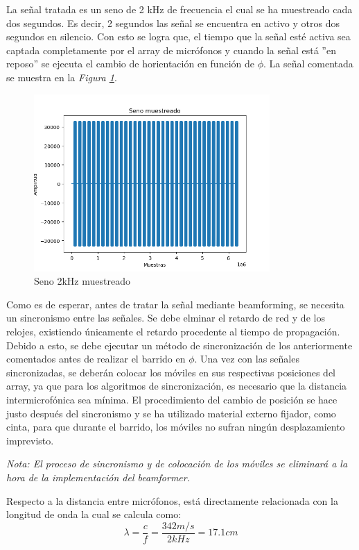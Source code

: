\documentclass[a4paper,11pt]{book}
\begin{document}
La señal tratada es un seno de 2 kHz de frecuencia el cual se ha muestreado cada dos segundos. Es decir, 2 segundos las señal se encuentra en activo y otros dos segundos en silencio. Con esto se logra que, el tiempo que la señal esté activa sea captada completamente por el array de micrófonos y cuando la señal está ''en reposo'' se ejecuta el cambio de horientación en función de $\phi$. La señal comentada se muestra en la \textit{Figura \ref{seno}}.

\begin{figure}[hbtp]
\centering
\includegraphics[width = 9cm]{FIGURAS/seno.png}
\caption{Seno 2kHz muestreado}
\label{seno}
\end{figure}

Como es de esperar, antes de tratar la señal mediante beamforming, se necesita un sincronismo entre las señales. Se debe elminar el retardo de red y de los relojes, existiendo únicamente el retardo procedente al tiempo de propagación. Debido a esto, se debe ejecutar un método de sincronización de los anteriormente comentados antes de realizar el barrido en $\phi$. Una vez con las señales sincronizadas, se deberán colocar los móviles en sus respectivas posiciones del array, ya que para los algoritmos de sincronización, es necesario que la distancia intermicrofónica sea mínima. El procedimiento del cambio de posición se hace justo después del sincronismo y se ha utilizado material externo fijador, como cinta, para que durante el barrido, los móviles no sufran ningún desplazamiento imprevisto.

\textit{Nota: El proceso de sincronismo y de colocación de los móviles se eliminará a la hora de la implementación del beamformer.}

Respecto a la distancia entre micrófonos, está directamente relacionada con la longitud de onda la cual se calcula como:
\begin{equation}
\lambda = \frac{c}{f} = \frac{342 m/s}{2 kHz} = 17.1 cm
\label{dist}
\end{equation}
\end{document}
